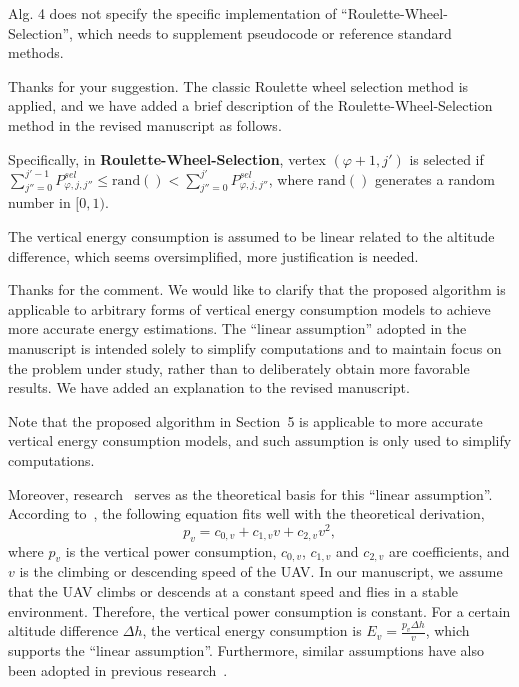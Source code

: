 \begin{revcomment}
	Alg. 4 does not specify the specific implementation of ``Roulette-Wheel-Selection'', which needs to supplement pseudocode or reference standard methods.
\end{revcomment}
\begin{revresponse}
	Thanks for your suggestion.
	The classic Roulette wheel selection method is applied, and we have added a brief description of the Roulette-Wheel-Selection method in the revised manuscript as follows.
	\begin{changes}
		Specifically, in \textbf{Roulette-Wheel-Selection}, vertex $(\varphi+1, j')$ is selected if $\sum_{j''=0}^{j'-1}{P^{sel}_{\varphi,j,j''}}\leq \text{rand}() < \sum_{j''=0}^{j'}{P^{sel}_{\varphi,j,j''}}$, where $\text{rand}()$ generates a random number in $[0,1)$.
	\end{changes}
\end{revresponse}

\begin{revcomment}
	The vertical energy consumption is assumed to be linear related to the altitude difference, which seems oversimplified, more justification is needed.
\end{revcomment}
\begin{revresponse}
	Thanks for the comment. %
	We would like to clarify that the proposed algorithm is applicable to arbitrary forms of vertical energy consumption models to achieve more accurate energy estimations.
	The ``linear assumption'' adopted in the manuscript is intended solely to simplify computations and to maintain focus on the problem under study, rather than to deliberately obtain more favorable results.
	We have added an explanation to the revised manuscript.

	\begin{changes}
		Note that the proposed algorithm in Section~5 is applicable to more accurate vertical energy consumption models, and such assumption is only used to simplify computations.
	\end{changes}

	Moreover, research~\cite{vertical-assumption} serves as the theoretical basis for this ``linear assumption''.
	According to~\cite{vertical-assumption}, the following equation fits well with the theoretical derivation,
	\begin{equation}
		p_v = c_{0,v} + c_{1,v}v + c_{2,v}v^2,
	\end{equation}
	where $p_v$ is the vertical power consumption, $c_{0,v}$, $c_{1,v}$ and $c_{2,v}$ are coefficients, and $v$ is the climbing or descending speed of the UAV.
	In our manuscript, we assume that the UAV climbs or descends at a constant speed and flies in a stable environment.
	Therefore, the vertical power consumption is constant.
	For a certain altitude difference $\Delta h$, the vertical energy consumption is $E_v=\frac{p_v\Delta h}{v}$, which supports the ``linear assumption''.
	Furthermore, similar assumptions have also been adopted in previous research~\cite{mgh}.
\end{revresponse}

